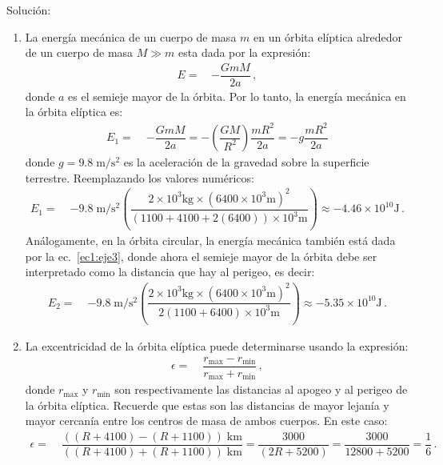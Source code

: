 \begin{enumerate}
Solución:
\begin{enumerate}
\item La energía mecánica de un cuerpo de masa $m$ en un órbita elíptica alrededor de un cuerpo de masa $M\gg m$ esta dada por la expresión:
%
\begin{align}
\label{ec1:eje3}
E=\,&-\dfrac{GmM}{2 a}\,,
\end{align}
%
donde $a$ es el semieje mayor de la órbita. 
Por lo tanto, la energía mecánica en la órbita elíptica es: 
%
\begin{align}
\label{ec2:eje3}
E_1=\;&-\dfrac{GmM}{2 a} = -\left(\dfrac{GM}{R^2}\right)\dfrac{mR^2}{2a}=-g\dfrac{mR^2}{2a}
\end{align}
%
donde $g=9.8\; \text{m}/\text{s}^2$ es la aceleración de la gravedad sobre la superficie terrestre. Reemplazando los valores numéricos:
%
\begin{align}
\label{ec3:eje3}
E_1=\;& -9.8\; \text{m}/\text{s}^2 \left(\dfrac{2\times 10^3 \text{kg}\times (6400\times 10^3 \text{m})^2}{\left(1100+4100+2(6400)\right)\times 10^3 \text{m}}\right)\approx -4.46 \times 10^{10} \text{J}\,.
\end{align}
%
Análogamente, en la órbita circular, la energía mecánica también está dada por la ec.~\eqref{ec1:eje3}, donde ahora el semieje mayor de la órbita debe ser interpretado como la distancia que hay al perigeo, es decir:
%
\begin{align}
\label{ec4:eje3}
E_2=\;& -9.8\; \text{m}/\text{s}^2 \left(\dfrac{2\times 10^3 \text{kg}\times (6400\times 10^3 \text{m})^2}{2\left(1100+6400\right)\times 10^3 \text{m}}\right)\approx -5.35 \times 10^{10} \text{J}\,.
\end{align}

\item La excentricidad de la órbita elíptica puede determinarse usando la expresión:
\begin{align}
\label{ec5:eje3}
\epsilon=\;& \dfrac{r_{\text{max}}-r_{\text{min}}}{r_{\text{max}}+r_{\text{min}}}\,,
\end{align}
%
donde $r_{\text{max}}$ y $r_{\text{min}}$ son respectivamente las distancias al apogeo y al perigeo de la órbita elíptica. Recuerde que estas son las distancias de mayor lejanía y mayor cercanía entre los centros de masa de ambos cuerpos. En este caso:
\begin{align}
\label{ec6:eje3}
\epsilon=\;& \dfrac{((R+4100)-(R+1100))\;\text{km}}{((R+4100)+(R+1100))\;\text{km}}=\dfrac{3000}{(2R+5200)}=\dfrac{3000}{12800+5200}=\dfrac{1}{6}\,.
\end{align}


\end{enumerate}
\end{enumerate}
